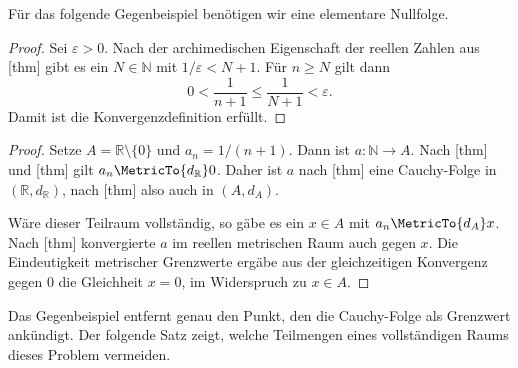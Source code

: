 \documentclass[main.tex]{subfiles}
\begin{document}
Für das folgende Gegenbeispiel benötigen wir eine elementare Nullfolge.

\begin{proof}
Sei \(\varepsilon>0\). Nach der archimedischen Eigenschaft der reellen
Zahlen aus [thm] gibt es ein
\(N\in\mathbb N\) mit \(1/\varepsilon<N+1\). Für \(n\geq N\) gilt dann
\[
 0<\frac1{n+1}\leq\frac1{N+1}<\varepsilon.
\]
Damit ist die Konvergenzdefinition erfüllt.
\end{proof}

\begin{proof}
Setze \(A=\mathbb R\setminus\{0\}\) und
\(a_n=1/(n+1)\). Dann ist \(a\colon\mathbb N\to A\). Nach
[thm] und
[thm] gilt
\(a_n\MetricTo{d_{\mathbb R}}0\). Daher ist \(a\) nach
[thm] eine Cauchy-Folge in
\((\mathbb R,d_{\mathbb R})\), nach
[thm] also auch in
\((A,d_A)\).

Wäre dieser Teilraum vollständig, so gäbe es ein \(x\in A\) mit
\(a_n\MetricTo{d_A}x\). Nach
[thm] konvergierte \(a\) im
reellen metrischen Raum auch gegen \(x\). Die Eindeutigkeit metrischer
Grenzwerte ergäbe aus der gleichzeitigen Konvergenz gegen \(0\) die Gleichheit
\(x=0\), im Widerspruch zu \(x\in A\).
\end{proof}

Das Gegenbeispiel entfernt genau den Punkt, den die Cauchy-Folge als Grenzwert
ankündigt. Der folgende Satz zeigt, welche Teilmengen eines vollständigen
Raums dieses Problem vermeiden.
\end{document}
